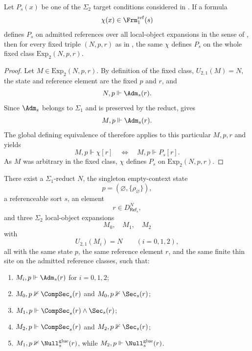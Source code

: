 \begin{lemma}\label{lem:fixed-classes-test-uniform-definability}
Let $P_s(x)$ be one of the $\Sigma_2$ target conditions considered in . If a formula
\[
\chi(x)\in\Frm_1^{\mathrm{ref}}(s)
\]
defines $P_s$ on admitted references over all local-object expansions in the sense of , then for every fixed triple $(N,p,r)$ as in , the same $\chi$ defines $P_s$ on the whole fixed class $\mathrm{Exp}_2(N,p,r)$.
\end{lemma}

\begin{proof}
Let $M\in\mathrm{Exp}_2(N,p,r)$. By definition of the fixed class, $U_{2,1}(M)=N$, the state and reference element are the fixed $p$ and $r$, and
\[
N,p\Vdash\Adm_s(r).
\]
Since $\Adm_s$ belongs to $\Sigma_1$ and is preserved by the reduct,  gives
\[
M,p\Vdash\Adm_s(r).
\]
The global defining equivalence of  therefore applies to this particular $M,p,r$ and yields
\[
M,p\Vdash\chi[r]\quad\Longleftrightarrow\quad M,p\Vdash P_s[r].
\]
As $M$ was arbitrary in the fixed class, $\chi$ defines $P_s$ on $\mathrm{Exp}_2(N,p,r)$.
\end{proof}

\begin{proposition}\label{prop:fixed-lower-reduct-three-expansions}
There exist a $\Sigma_1$-reduct $N$, the singleton empty-context state
\[
p=(\varnothing,\{\rho_\varnothing\}),
\]
a referenceable sort $s$, an element
\[
r\in D_{\mathsf{Ref}_s}^{N},
\]
and three $\Sigma_2$ local-object expansions
\[
M_0,\quad M_1,\quad M_2
\]
with
\[
U_{2,1}(M_i)=N\qquad (i=0,1,2),
\]
all with the same state $p$, the same reference element $r$, and the same finite thin site on the admitted reference classes, such that:
\begin{enumerate}[label=(\roman*),nosep]
\item $M_i,p\Vdash \Adm_s(r)$ for $i=0,1,2$;
\item $M_0,p\nVdash \CompSec_s(r)$ and $M_0,p\nVdash \Sec_s(r)$;
\item $M_1,p\Vdash \CompSec_s(r)\land \Sec_s(r)$;
\item $M_2,p\Vdash \CompSec_s(r)$ and $M_2,p\nVdash \Sec_s(r)$;
\item $M_1,p\nVdash \Null^{\mathrm{glue}}_s(r)$, while $M_2,p\Vdash \Null^{\mathrm{glue}}_s(r)$.
\end{enumerate}
\end{proposition}

